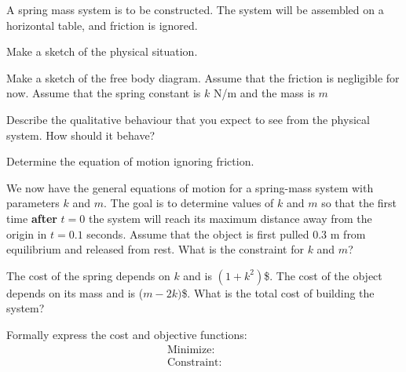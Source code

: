 \begin{problem}
\item A spring mass system is to be constructed. The system will be
  assembled on a horizontal table, and friction is ignored.
  \begin{subproblem}
    \item Make a sketch of the physical situation.
      \vfill
    \item Make a sketch of the free body diagram.  Assume that the
      friction is negligible for now. Assume that the spring constant
      is $k$ N/m and the mass is $m$ 
      \vfill
    \item Describe the qualitative behaviour that you expect to see
      from the physical system. How should it behave?
      \vfill
    \item Determine the equation of motion ignoring friction.
      \vfill
  \end{subproblem}

  \clearpage

\item We now have the general equations of motion for a spring-mass
  system with parameters $k$ and $m$. The goal is to determine values
  of $k$ and $m$ so that the first time \textbf{after} $t=0$ the
  system will reach its maximum distance away from the origin in
  $t=0.1$ seconds. Assume that the object is first pulled 0.3 m from
  equilibrium and released from rest. What is the constraint for $k$
  and $m$?

  \vfill

\item The cost of the spring depends on $k$ and is $(1+k^2)$\$. The cost of
  the object depends on its mass and is ($m-2k)$\$. What is the
  total cost of building the system?

  \vspace{4em}

\item Formally express the cost and objective functions:
    \label{activity:optimization:spring}
    \begin{eqnarray*}
      \mathrm{Minimize:} & &  \\
      \mathrm{Constraint:} & &
    \end{eqnarray*}



\end{problem}


\postClass

